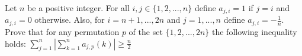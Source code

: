 Let $n$ be a positive integer. For all $i, j \in \{1,2,...,n\}$ define $a_{j,i} = 1$ if $j = i$ and $a_{j,i} = 0$ otherwise. Also, for $i = n+1,...,2n$ and $j = 1,...,n$ define $a_{j,i} = -\frac{1}{n}$.
Prove that for any permutation $p$ of the set $\{1,2,...,2n\}$ the following inequality holds: $\sum_{j=1}^{n}\left|\sum_{k=1}^{n} a_{j,p}(k)\right| \ge \frac{n}{2}$